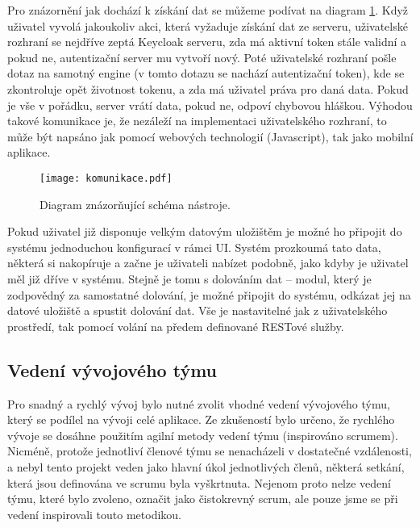\par Pro znázornění jak dochází k získání dat se můžeme podívat na diagram \ref{komunikace}. Když uživatel vyvolá jakoukoliv akci, která vyžaduje získání dat ze serveru, uživatelské rozhraní se nejdříve zeptá Keycloak serveru, zda má aktivní token stále validní a pokud ne, autentizační server mu vytvoří nový. Poté uživatelské rozhraní pošle dotaz na samotný engine (v tomto dotazu se nachází autentizační token), kde se zkontroluje opět životnost tokenu, a zda má uživatel práva pro daná data. Pokud je vše v pořádku, server vrátí data, pokud ne, odpoví chybovou hláškou. Výhodou takové komunikace je, že nezáleží na implementaci uživatelského rozhraní, to může být napsáno jak pomocí webových technologií (Javascript), tak jako mobilní aplikace.

\begin{figure}[htp]
\centering
\texttt{[image: komunikace.pdf]}
\caption{Diagram znázorňující schéma nástroje.}
\label{komunikace}
\end{figure}

\par Pokud uživatel již disponuje velkým datovým uložištěm je možné ho připojit do systému jednoduchou konfigurací v rámci UI. Systém prozkoumá tato data, některá si nakopíruje a začne je uživateli nabízet podobně, jako kdyby je uživatel měl již dříve v systému. Stejně je tomu s dolováním dat -- modul, který je zodpovědný za samostatné dolování, je možné připojit do systému, odkázat jej na datové uložiště a spustit dolování dat. Vše je nastavitelné jak z uživatelského prostředí, tak pomocí volání na předem definované RESTové služby.

\subsection{Vedení vývojového týmu}
\par Pro snadný a rychlý vývoj bylo nutné zvolit vhodné vedení vývojového týmu, který se podílel na vývoji celé aplikace. Ze zkušeností bylo určeno, že rychlého vývoje se dosáhne použitím agilní metody vedení týmu (inspirováno scrumem). Nicméně, protože jednotliví členové týmu se nenacházeli v dostatečné vzdálenosti, a nebyl tento projekt veden jako hlavní úkol jednotlivých členů, některá setkání, která jsou definována ve scrumu byla vyškrtnuta. Nejenom proto nelze vedení týmu, které bylo zvoleno, označit jako čistokrevný scrum, ale pouze jsme se při vedení inspirovali touto metodikou.

